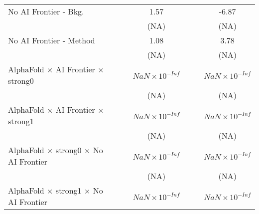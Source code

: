 \begin{tabular}{lcccccc}
   No AI Frontier - Bkg.                                                      &                        &                        & 1.57                   &         &                        & -6.87\\   
                                                                              &                        &                        & (NA)                   &         &                        & (NA)\\   
   No AI Frontier - Method                                                    &                        &                        & 1.08                   &         &                        & 3.78\\   
                                                                              &                        &                        & (NA)                   &         &                        & (NA)\\   
   AlphaFold $\times$ AI Frontier $\times$ strong0                            &                        &                        & $NaN\times 10^{-Inf}$  &         &                        & $NaN\times 10^{-Inf}$\\    
                                                                              &                        &                        & (NA)                   &         &                        & (NA)\\   
   AlphaFold $\times$ AI Frontier $\times$ strong1                            &                        &                        & $NaN\times 10^{-Inf}$  &         &                        & $NaN\times 10^{-Inf}$\\    
                                                                              &                        &                        & (NA)                   &         &                        & (NA)\\   
   AlphaFold $\times$ strong0 $\times$ No AI Frontier                         &                        &                        & $NaN\times 10^{-Inf}$  &         &                        & $NaN\times 10^{-Inf}$\\    
                                                                              &                        &                        & (NA)                   &         &                        & (NA)\\   
   AlphaFold $\times$ strong1 $\times$ No AI Frontier                         &                        &                        & $NaN\times 10^{-Inf}$  &         &                        & $NaN\times 10^{-Inf}$\\    

\end{tabular}

